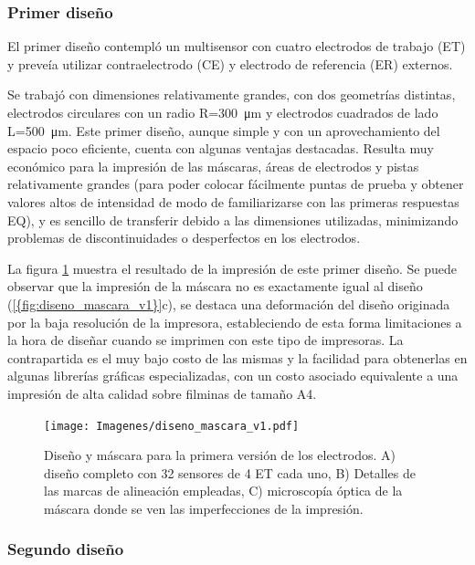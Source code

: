 		\subsubsection{Primer diseño}

		     El primer diseño contempló un multisensor con cuatro electrodos de trabajo (ET) y preveía utilizar contraelectrodo (CE) y electrodo de referencia (ER) externos. 

     	     Se trabajó con dimensiones relativamente grandes, con dos geometrías distintas, electrodos circulares con un radio R=\SI{300}{\um} y electrodos cuadrados de lado L=\SI{500}{\um}. Este primer diseño, aunque simple y con un aprovechamiento del espacio poco eficiente, cuenta con algunas ventajas destacadas. Resulta muy económico para la impresión de las máscaras, áreas de electrodos y pistas relativamente grandes (para poder colocar fácilmente puntas de prueba y obtener valores altos de intensidad de modo de familiarizarse con las primeras respuestas EQ), y es sencillo de transferir debido a las dimensiones utilizadas, minimizando problemas de discontinuidades o desperfectos en los electrodos.
		     		
		     La figura \ref{fig:diseno_mascara_v1} muestra el resultado de la impresión de este primer diseño. Se puede observar que la impresión de la máscara no es exactamente igual al diseño (\ref{{fig:diseno_mascara_v1}}c), se destaca una deformación del diseño originada por la baja resolución de la impresora, estableciendo de esta forma limitaciones a la hora de diseñar cuando se imprimen con este tipo de impresoras. La contrapartida es el muy bajo costo de las mismas y la facilidad para obtenerlas en algunas librerías gráficas especializadas, con un costo asociado equivalente a una impresión de alta calidad sobre filminas de tamaño A4.
					
					\begin{figure}[h!]
		 	       	\texttt{[image: Imagenes/diseno\_mascara\_v1.pdf]}
 		       		\caption[Primer diseño y máscara de los sensores]{Diseño y máscara para la primera versión de los electrodos. A) diseño completo con 32 sensores de 4 ET cada uno, B) Detalles de las marcas de alineación empleadas, C) microscopía óptica de la máscara donde se ven las imperfecciones de la impresión.}
 		         	\label{fig:diseno_mascara_v1}
 		     		\end{figure}

		\subsubsection{Segundo diseño}

